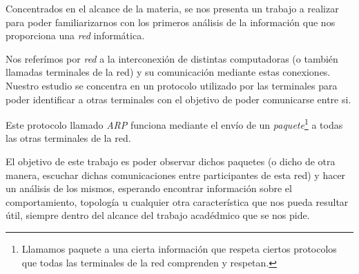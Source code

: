 Concentrados en el alcance de la materia, se nos presenta un trabajo
a realizar para poder familiarizarnos con los primeros an\'alisis
de la informaci\'on que nos proporciona una \textit{red} inform\'atica.

\par Nos refer\'imos por \textit{red} a la interconexi\'on de distintas
	computadoras (o tambi\'en llamadas terminales de la red) y su 
    comunicaci\'on mediante estas conexiones. Nuestro estudio se 
    concentra en un protocolo utilizado por las terminales para poder
    identificar a otras terminales con el objetivo de poder comunicarse
    entre si.
    
\par Este protocolo llamado \textit{ARP} funciona mediante el env\'io de
	un \textit{paquete}\footnote{Llamamos paquete a una cierta informaci\'on
    que respeta ciertos protocolos que todas las terminales de la red
    comprenden y respetan.} a todas las otras terminales de la red.

\par El objetivo de este trabajo es poder observar dichos paquetes (o
	dicho de otra manera, escuchar dichas comunicaciones entre participantes
    de esta red) y hacer un an\'alisis de los mismos, esperando encontrar
    informaci\'on sobre el comportamiento, topolog\'ia u cualquier otra
    caracter\'istica que nos pueda resultar \'util, siempre dentro del
    alcance del trabajo acad\'edmico que se nos pide.